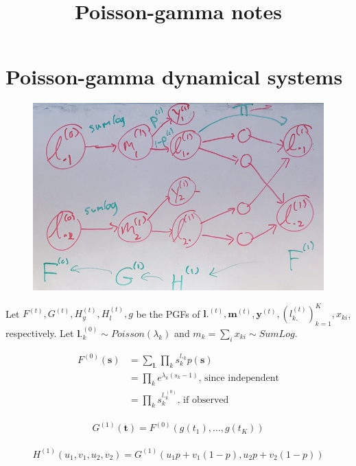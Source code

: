 \documentclass{article}
\title{Poisson-gamma notes}
\begin{document}
\maketitle

\section{Poisson-gamma dynamical systems}

\begin{figure}[h]
\includegraphics[width=\textwidth]{pgds_cropped}
\end{figure}

Let $F^{(t)}, G^{(t)}, H_y^{(t)}, H_l^{(t)}, g$ be the PGFs of $\mathbf{l.}^{(t)}, \mathbf{m}^{(t)}, \mathbf{y}^{(t)}, (l_{k.}^{(t)})_{k=1}^K, x_{ki}$, respectively. Let $\mathbf{l.}^{(0)}_k \sim Poisson(\lambda_k)$ and $m_k = \sum_i x_{ki} \sim SumLog$.

\begin{align*}
F^{(0)}(\mathbf{s}) &= \sum_{\mathbf{l.}} \prod_k s_k^{l._k} p(\mathbf{s}) \\
&= \prod_k e^{\lambda_k(s_k-1)} \text{, since independent} \\
&= \prod_k s_k^{l._k^{(0)}} \text{, if observed}
\end{align*}

\begin{align*}
G^{(1)}(\mathbf{t}) = F^{(0)}(g(t_1), \ldots, g(t_K))
\end{align*}

\begin{align*}
H^{(1)}(u_1, v_1, u_2, v_2) = G^{(1)}(u_1p + v_1(1-p), u_2p + v_2(1-p))
\end{align*}
\end{document}
